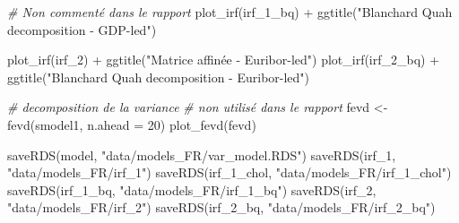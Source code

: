 \documentclass[
  11pt,
]{article}
\newenvironment{Shaded}{\begin{snugshade}}{\end{snugshade}}
\newcommand{\AttributeTok}[1]{\textcolor[rgb]{0.77,0.63,0.00}{#1}}
\newcommand{\CommentTok}[1]{\textcolor[rgb]{0.56,0.35,0.01}{\textit{#1}}}
\newcommand{\DecValTok}[1]{\textcolor[rgb]{0.00,0.00,0.81}{#1}}
\newcommand{\FunctionTok}[1]{\textcolor[rgb]{0.00,0.00,0.00}{#1}}
\newcommand{\NormalTok}[1]{#1}
\newcommand{\OtherTok}[1]{\textcolor[rgb]{0.56,0.35,0.01}{#1}}
\newcommand{\SpecialCharTok}[1]{\textcolor[rgb]{0.00,0.00,0.00}{#1}}
\newcommand{\StringTok}[1]{\textcolor[rgb]{0.31,0.60,0.02}{#1}}
\begin{document}
\begin{Shaded}
\begin{Highlighting}[]
\CommentTok{\# Non commenté dans le rapport}
\FunctionTok{plot\_irf}\NormalTok{(irf\_1\_bq) }\SpecialCharTok{+} \FunctionTok{ggtitle}\NormalTok{(}\StringTok{"Blanchard Quah decomposition {-} GDP{-}led"}\NormalTok{) }

\FunctionTok{plot\_irf}\NormalTok{(irf\_2) }\SpecialCharTok{+} \FunctionTok{ggtitle}\NormalTok{(}\StringTok{"Matrice affinée {-} Euribor{-}led"}\NormalTok{)}
\FunctionTok{plot\_irf}\NormalTok{(irf\_2\_bq) }\SpecialCharTok{+} \FunctionTok{ggtitle}\NormalTok{(}\StringTok{"Blanchard Quah decomposition {-} Euribor{-}led"}\NormalTok{)}

\CommentTok{\# decomposition de la variance}
\CommentTok{\# non utilisé dans le rapport}
\NormalTok{fevd }\OtherTok{\textless{}{-}} \FunctionTok{fevd}\NormalTok{(smodel1, }\AttributeTok{n.ahead =} \DecValTok{20}\NormalTok{)}
\FunctionTok{plot\_fevd}\NormalTok{(fevd)}


\FunctionTok{saveRDS}\NormalTok{(model, }\StringTok{"data/models\_FR/var\_model.RDS"}\NormalTok{)}
\FunctionTok{saveRDS}\NormalTok{(irf\_1, }\StringTok{"data/models\_FR/irf\_1"}\NormalTok{)}
\FunctionTok{saveRDS}\NormalTok{(irf\_1\_chol, }\StringTok{"data/models\_FR/irf\_1\_chol"}\NormalTok{)}
\FunctionTok{saveRDS}\NormalTok{(irf\_1\_bq, }\StringTok{"data/models\_FR/irf\_1\_bq"}\NormalTok{)}
\FunctionTok{saveRDS}\NormalTok{(irf\_2, }\StringTok{"data/models\_FR/irf\_2"}\NormalTok{)}
\FunctionTok{saveRDS}\NormalTok{(irf\_2\_bq, }\StringTok{"data/models\_FR/irf\_2\_bq"}\NormalTok{)}
\end{Highlighting}
\end{Shaded}
\end{document}
